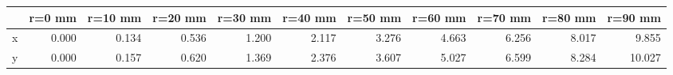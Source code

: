 \documentclass[convert={convertexe={magick.exe}}]{standalone}
\begin{document}
\begin{tabular}{lrrrrrrrrrr}
\toprule
{} &  r=0 mm &  r=10 mm &  r=20 mm &  r=30 mm &  r=40 mm &  r=50 mm &  r=60 mm &  r=70 mm &  r=80 mm &  r=90 mm \\
\midrule
x &   0.000 &    0.134 &    0.536 &    1.200 &    2.117 &    3.276 &    4.663 &    6.256 &    8.017 &    9.855 \\
y &   0.000 &    0.157 &    0.620 &    1.369 &    2.376 &    3.607 &    5.027 &    6.599 &    8.284 &   10.027 \\
\bottomrule
\end{tabular}
\end{document}
